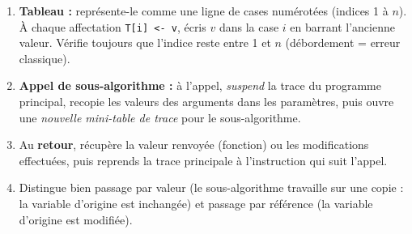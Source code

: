 \documentclass[11pt]{article}
\newcommand{\cle}[1]{{\popxbold\color{popdark}#1}}
\begin{document}
\begin{methode}
\begin{enumerate}
  \item \textbf{Tableau :} représente-le comme une ligne de cases numérotées (indices 1 à $n$). À chaque affectation \texttt{T[i] <- v}, écris $v$ dans la case $i$ en barrant l'ancienne valeur. Vérifie toujours que l'indice reste entre 1 et $n$ (débordement = erreur classique).
  \item \textbf{Appel de sous-algorithme :} à l'appel, \emph{suspend} la trace du programme principal, recopie les valeurs des arguments dans les paramètres, puis ouvre une \emph{nouvelle mini-table de trace} pour le sous-algorithme.
  \item Au \textbf{retour}, récupère la valeur renvoyée (fonction) ou les modifications effectuées, puis reprends la trace principale à l'instruction qui suit l'appel.
  \item Distingue bien \cle{passage par valeur} (le sous-algorithme travaille sur une copie : la variable d'origine est inchangée) et \cle{passage par référence} (la variable d'origine est modifiée).
\end{enumerate}
\end{methode}
\end{document}
